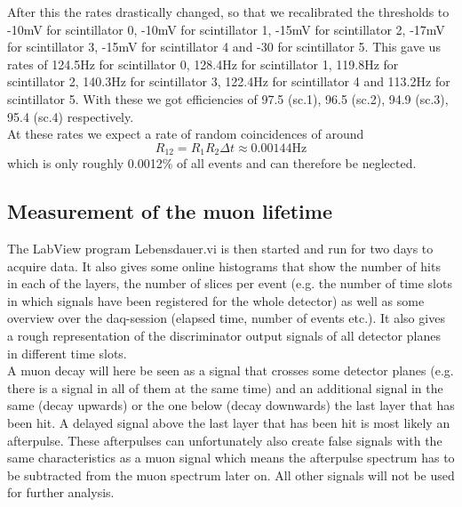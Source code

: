 After this the rates drastically changed, so that we recalibrated the thresholds to -10mV for scintillator 0, -10mV for scintillator 1, -15mV for scintillator 2, -17mV for scintillator 3, -15mV for scintillator 4 and -30 for scintillator 5.
This gave us rates of 124.5Hz for scintillator 0, 128.4Hz for scintillator 1, 119.8Hz for scintillator 2, 140.3Hz for scintillator 3, 122.4Hz for scintillator 4 and 113.2Hz for scintillator 5. With these we got efficiencies of 97.5 (sc.1), 96.5 (sc.2), 94.9 (sc.3), 95.4 (sc.4) respectively. \\
At these rates we expect a rate of random coincidences of around 
\begin{equation}
	R_{12} = R_1R_2\Delta t \approx 0.00144\text{Hz}
\end{equation}
which is only roughly 0.0012\% of all events and can therefore be neglected.
\\

\subsection{Measurement of the muon lifetime}
The LabView program Lebensdauer.vi is then started and run for two days to acquire data. It also gives some online histograms that show the number of hits in each of the layers, the number of slices per event (e.g. the number of time slots in which signals have been registered for the whole detector) as well as some overview over the daq-session (elapsed time, number of events etc.). It also gives a rough representation of the discriminator output signals of all detector planes in different time slots. \\
A muon decay will here be seen as a signal that crosses some detector planes (e.g. there is a signal in all of them at the same time) and an additional signal in the same (decay upwards) or the one below (decay downwards) the last layer that has been hit. A delayed signal above the last layer that has been hit is most likely an afterpulse. These afterpulses can unfortunately also create false signals with the same characteristics as a muon signal which means the afterpulse spectrum has to be subtracted from the muon spectrum later on. All other signals will not be used for further analysis. \\

